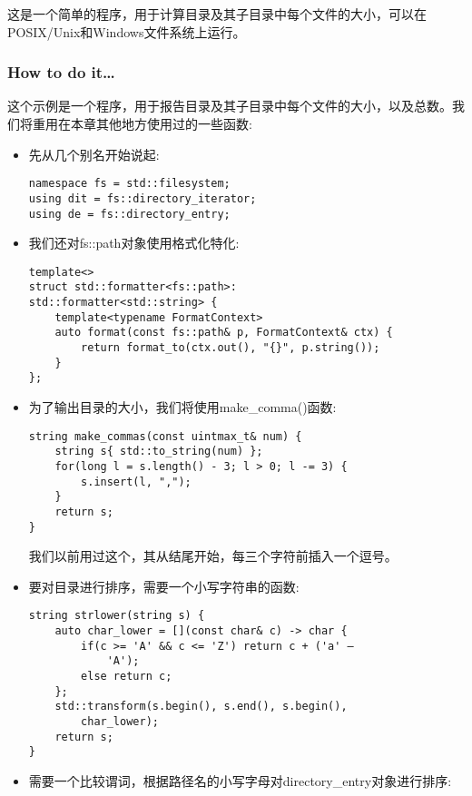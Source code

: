 
这是一个简单的程序，用于计算目录及其子目录中每个文件的大小，可以在POSIX/Unix和Windows文件系统上运行。

\subsubsection{How to do it…}

这个示例是一个程序，用于报告目录及其子目录中每个文件的大小，以及总数。我们将重用在本章其他地方使用过的一些函数:

\begin{itemize}
\item 
先从几个别名开始说起:

\begin{lstlisting}[style=styleCXX]
namespace fs = std::filesystem;
using dit = fs::directory_iterator;
using de = fs::directory_entry;
\end{lstlisting}

\item 
我们还对fs::path对象使用格式化特化:

\begin{lstlisting}[style=styleCXX]
template<>
struct std::formatter<fs::path>:
std::formatter<std::string> {
	template<typename FormatContext>
	auto format(const fs::path& p, FormatContext& ctx) {
		return format_to(ctx.out(), "{}", p.string());
	}
};
\end{lstlisting}

\item 
为了输出目录的大小，我们将使用make\_comma()函数:

\begin{lstlisting}[style=styleCXX]
string make_commas(const uintmax_t& num) {
	string s{ std::to_string(num) };
	for(long l = s.length() - 3; l > 0; l -= 3) {
		s.insert(l, ",");
	}
	return s;
}
\end{lstlisting}

我们以前用过这个，其从结尾开始，每三个字符前插入一个逗号。

\item 
要对目录进行排序，需要一个小写字符串的函数:

\begin{lstlisting}[style=styleCXX]
string strlower(string s) {
	auto char_lower = [](const char& c) -> char {
		if(c >= 'A' && c <= 'Z') return c + ('a' –
			'A');
		else return c;
	};
	std::transform(s.begin(), s.end(), s.begin(),
		char_lower);
	return s;
}
\end{lstlisting}

\item 
需要一个比较谓词，根据路径名的小写字母对directory\_entry对象进行排序:


\end{itemize}
